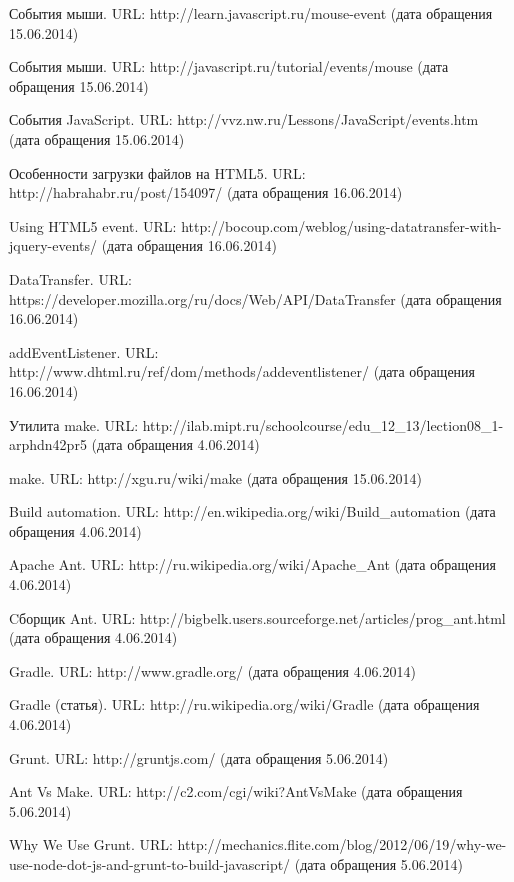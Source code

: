 \begin{thebibliography}{99}
	События мыши. URL: http://learn.javascript.ru/mouse-event (дата обращения 15.06.2014)

	События мыши. URL: http://javascript.ru/tutorial/events/mouse (дата обращения 15.06.2014)

	События JavaScript. URL: http://vvz.nw.ru/Lessons/JavaScript/events.htm (дата обращения 15.06.2014)

	Особенности загрузки файлов на HTML5. URL: http://habrahabr.ru/post/154097/ (дата обращения 16.06.2014)

	Using HTML5 event. URL: http://bocoup.com/weblog/using-datatransfer-with-jquery-events/ (дата обращения 16.06.2014)

	DataTransfer. URL: https://developer.mozilla.org/ru/docs/Web/API/DataTransfer (дата обращения 16.06.2014)

	addEventListener. URL: http://www.dhtml.ru/ref/dom/methods/addeventlistener/ (дата обращения 16.06.2014)

	Утилита make. URL: http://ilab.mipt.ru/schoolcourse/edu\_12\_13/lection08\_1-arphdn42pr5 (дата обращения 4.06.2014)

	make. URL: http://xgu.ru/wiki/make (дата обращения 15.06.2014)

	Build automation. URL: http://en.wikipedia.org/wiki/Build\_automation (дата обращения 4.06.2014)

	Apache Ant. URL: http://ru.wikipedia.org/wiki/Apache\_Ant (дата обращения 4.06.2014)

	Cборщик Ant. URL: http://bigbelk.users.sourceforge.net/articles/prog\_ant.html (дата обращения 4.06.2014)

	Gradle. URL: http://www.gradle.org/ (дата обращения 4.06.2014)

	Gradle (статья). URL: http://ru.wikipedia.org/wiki/Gradle (дата обращения 4.06.2014)

	Grunt. URL: http://gruntjs.com/ (дата обращения 5.06.2014)

	Ant Vs Make. URL: http://c2.com/cgi/wiki?AntVsMake (дата обращения 5.06.2014)

	Why We Use Grunt. URL: http://mechanics.flite.com/blog/2012/06/19/why-we-use-node-dot-js-and-grunt-to-build-javascript/ (дата обращения 5.06.2014)


\end{thebibliography}
